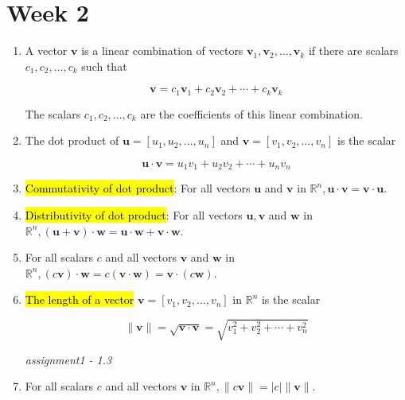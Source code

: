 \documentclass[10pt]{article}
\begin{document}
\section{Week 2}
\begin{enumerate}

\item A vector $\mathbf{v}$ is a linear combination of vectors $\mathbf{v}_{1}, \mathbf{v}_{2}, \ldots, \mathbf{v}_{k}$ if there are scalars $c_{1}, c_{2}, \ldots, c_{k}$ such that

$$
\mathbf{v}=c_{1} \mathbf{v}_{1}+c_{2} \mathbf{v}_{2}+\cdots+c_{k} \mathbf{v}_{k}
$$

The scalars $c_{1}, c_{2}, \ldots, c_{k}$ are the coefficients of this linear combination.

\item The dot product of $\mathbf{u}=\left[u_{1}, u_{2}, \ldots, u_{n}\right]$ and $\mathbf{v}=\left[v_{1}, v_{2}, \ldots, v_{n}\right]$ is the scalar

$$
\mathbf{u} \cdot \mathbf{v}=u_{1} v_{1}+u_{2} v_{2}+\cdots+u_{n} v_{n}
$$


\newpage



\item \hl{Commutativity of dot product}: For all vectors $\mathbf{u}$ and $\mathbf{v}$ in $\mathbb{R}^{n}, \mathbf{u} \cdot \mathbf{v}=\mathbf{v} \cdot \mathbf{u}$.

\item \hl{Distributivity of dot product}: For all vectors $\mathbf{u}, \mathbf{v}$ and $\mathbf{w}$ in $\mathbb{R}^{n},(\mathbf{u}+\mathbf{v}) \cdot \mathbf{w}=\mathbf{u} \cdot \mathbf{w}+\mathbf{v} \cdot \mathbf{w}$.

\item For all scalars $c$ and all vectors $\mathbf{v}$ and $\mathbf{w}$ in $\mathbb{R}^{n},(c \mathbf{v}) \cdot \mathbf{w}=c(\mathbf{v} \cdot \mathbf{w})=\mathbf{v} \cdot(c \mathbf{w})$.

\item \hl{The length of a vector} $\mathbf{v}=\left[v_{1}, v_{2}, \ldots, v_{n}\right]$ in $\mathbb{R}^{n}$ is the scalar

$$
\|\mathbf{v}\|=\sqrt{\mathbf{v} \cdot \mathbf{v}}=\sqrt{v_{1}^{2}+v_{2}^{2}+\cdots+v_{n}^{2}}
$$

\textit{assignment1 -  1.3}
\item For all scalars $c$ and all vectors $\mathbf{v}$ in $\mathbb{R}^{n},\|c \mathbf{v}\|=|c|\|\mathbf{v}\|$.


\end{enumerate}
\end{document}
